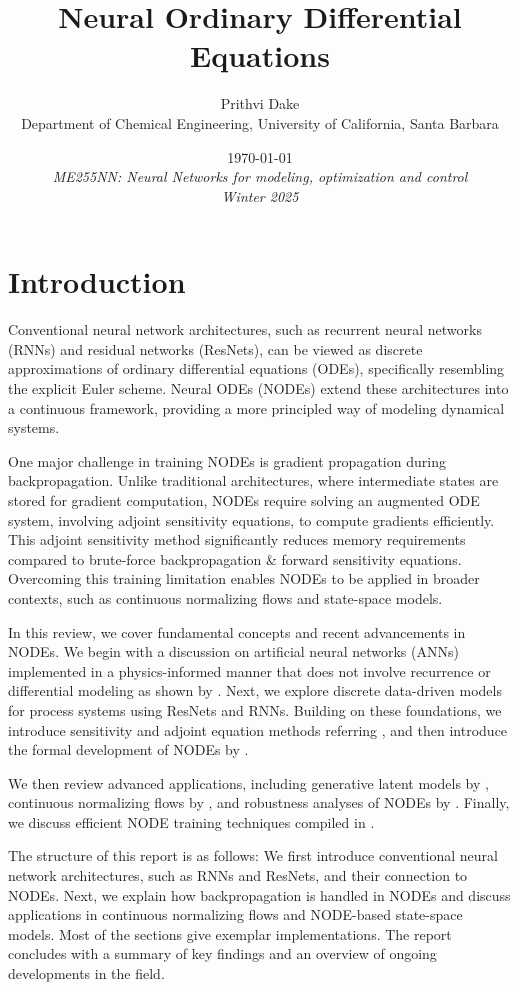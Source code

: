 \documentclass[fontsize=11pt]{article}
\title{\bf{Neural Ordinary Differential Equations}}
\author{Prithvi Dake\\
Department of Chemical Engineering, University of California, Santa Barbara}
\date{\today\\
\textit{ME255NN: Neural Networks for modeling, optimization and control} \\
\textit{Winter 2025}}
\theoremstyle{definition}
\begin{document}
\maketitle
\section{Introduction}

Conventional neural network architectures, such as recurrent neural networks 
(RNNs) and residual networks (ResNets), can be viewed as discrete approximations
of ordinary differential equations (ODEs), specifically resembling the explicit
Euler scheme. Neural ODEs (NODEs) extend these architectures into a continuous 
framework, providing a more principled way of modeling dynamical systems.

One major challenge in training NODEs is gradient propagation during backpropagation.
Unlike traditional architectures, where intermediate states are stored for
gradient computation, NODEs require solving an augmented ODE system, involving
adjoint sensitivity equations, to compute gradients efficiently. This adjoint sensitivity 
method significantly reduces memory requirements compared to brute-force 
backpropagation \& forward sensitivity equations. Overcoming this training limitation enables NODEs to be 
applied in broader contexts, such as continuous normalizing flows and state-space 
models.

In this review, we cover fundamental concepts and recent advancements in NODEs. 
We begin with a discussion on artificial neural networks (ANNs) implemented in 
a physics-informed manner that does not involve recurrence or differential 
modeling as shown by \cite{raissi:perdikaris:karniadakis:2019}. Next, we explore
discrete data-driven models for process systems using ResNets and RNNs. 
Building on these foundations, we introduce sensitivity and adjoint equation 
methods referring \cite{stapor:froehlich:hasenauer:2018}, and then introduce the 
formal development of NODEs by \cite{chen:rubanova:bettencourt:duvenaud:2018}. 

We then review advanced applications, including generative latent models by
\cite{rubanova:chen:duvenaud:2019}, continuous normalizing flows by
\cite{grathwohl:chen:bettencourt:sutskever:duvenaud:2018}, and robustness 
analyses of NODEs by \cite{yan:du:tan:feng:2019}. Finally, we discuss efficient 
NODE training techniques compiled in \cite{finlay:jacobsen:nurbekyan:oberman:2020}.

The structure of this report is as follows: We first introduce conventional 
neural network architectures, such as RNNs and ResNets, and their connection 
to NODEs. Next, we explain how backpropagation is handled in NODEs and discuss 
applications in continuous normalizing flows and NODE-based state-space models. 
Most of the sections give exemplar implementations. 
The report concludes with a summary of key findings and an overview of ongoing 
developments in the field.
\end{document}
